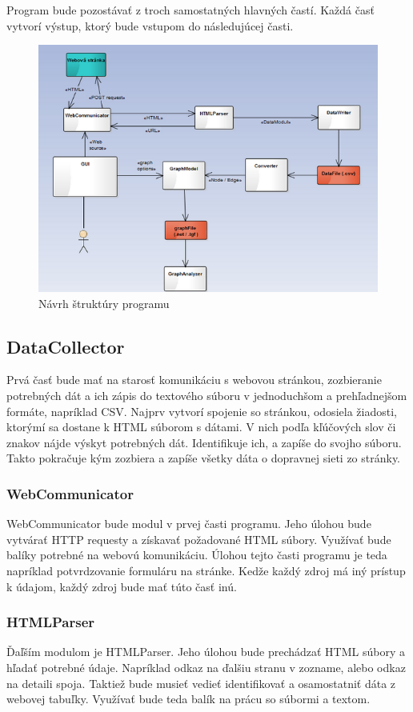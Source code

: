 \documentclass[12pt,twoside,slovak,a4paper]{article}
\begin{document}
Program bude pozostávať z troch samostatných hlavných častí. Každá časť vytvorí výstup, ktorý bude vstupom do následujúcej časti. 

	\begin{figure}[H]
	 \caption{Návrh štruktúry programu}
	 \includegraphics{prog_struct2}
	 \end{figure}
			
	\subsection{DataCollector}
	Prvá časť bude mať na starosť komunikáciu s webovou stránkou, zozbieranie potrebných dát a ich zápis do textového súboru v jednoduchšom a prehľadnejšom formáte, napríklad CSV. Najprv vytvorí spojenie so stránkou, odosiela žiadosti, ktorýmí sa dostane k HTML súborom s dátami. V nich podľa kľúčových slov či znakov nájde výskyt potrebných dát. Identifikuje ich, a zapíše do svojho súboru. Takto pokračuje kým zozbiera a zapíše všetky dáta o dopravnej sieti zo stránky.
	 
		\subsubsection{WebCommunicator}
		WebCommunicator bude modul v prvej časti programu. Jeho úlohou bude vytvárať HTTP requesty a získavať požadované HTML súbory. Využívať bude balíky potrebné na webovú komunikáciu. Úlohou tejto časti programu je teda napríklad potvrdzovanie formuláru na stránke. Kedže každý zdroj má iný prístup k údajom, každý zdroj bude mať túto časť inú.
				
		\subsubsection{HTMLParser}
		Ďaľším modulom je HTMLParser. Jeho úlohou bude prechádzať HTML súbory a hľadať potrebné údaje. Napríklad odkaz na ďalšiu stranu v zozname, alebo odkaz na detaili spoja. Taktiež bude musieť vedieť identifikovať a osamostatniť dáta z webovej tabuľky. Využívať bude teda balík na prácu so súbormi a textom.
\end{document}
